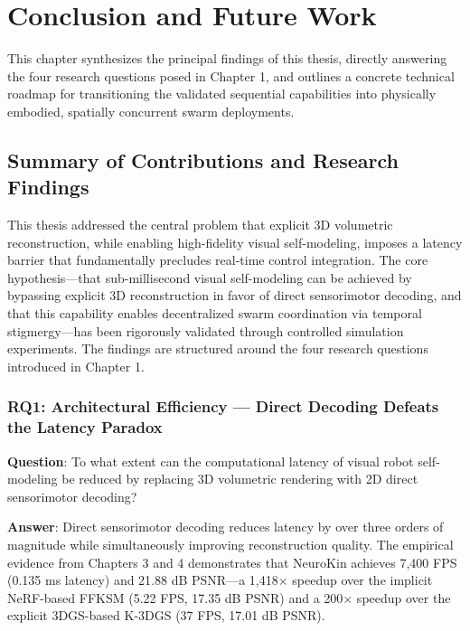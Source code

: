 \documentclass[12pt,a4paper,oneside]{report}
\begin{document}
\chapter{Conclusion and Future Work}
\label{chap:conclusion_future_work_ch8}

This chapter synthesizes the principal findings of this thesis, directly answering the four research questions posed in Chapter 1, and outlines a concrete technical roadmap for transitioning the validated sequential capabilities into physically embodied, spatially concurrent swarm deployments.

\section{Summary of Contributions and Research Findings}

This thesis addressed the central problem that explicit 3D volumetric reconstruction, while enabling high-fidelity visual self-modeling, imposes a latency barrier that fundamentally precludes real-time control integration. The core hypothesis---that sub-millisecond visual self-modeling can be achieved by bypassing explicit 3D reconstruction in favor of direct sensorimotor decoding, and that this capability enables decentralized swarm coordination via temporal stigmergy---has been rigorously validated through controlled simulation experiments. The findings are structured around the four research questions introduced in Chapter 1.

\subsection{RQ1: Architectural Efficiency --- Direct Decoding Defeats the Latency Paradox}

\textbf{Question}: To what extent can the computational latency of visual robot self-modeling be reduced by replacing 3D volumetric rendering with 2D direct sensorimotor decoding?

\textbf{Answer}: Direct sensorimotor decoding reduces latency by over three orders of magnitude while simultaneously improving reconstruction quality. The empirical evidence from Chapters 3 and 4 demonstrates that NeuroKin achieves 7,400 FPS (0.135 ms latency) and 21.88 dB PSNR---a 1,418$\times$ speedup over the implicit NeRF-based FFKSM (5.22 FPS, 17.35 dB PSNR) and a 200$\times$ speedup over the explicit 3DGS-based K-3DGS (37 FPS, 17.01 dB PSNR).
\end{document}

